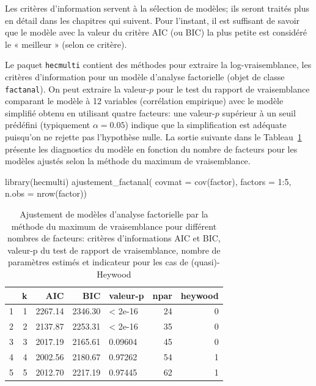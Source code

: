 \documentclass[
  11pt,
  letterpaper,
]{scrbook}
\newenvironment{Shaded}{\begin{snugshade}}{\end{snugshade}}
\newcommand{\AttributeTok}[1]{\textcolor[rgb]{0.40,0.45,0.13}{#1}}
\newcommand{\DecValTok}[1]{\textcolor[rgb]{0.68,0.00,0.00}{#1}}
\newcommand{\FunctionTok}[1]{\textcolor[rgb]{0.28,0.35,0.67}{#1}}
\newcommand{\NormalTok}[1]{\textcolor[rgb]{0.00,0.23,0.31}{#1}}
\newcommand{\SpecialCharTok}[1]{\textcolor[rgb]{0.37,0.37,0.37}{#1}}
\theoremstyle{definition}
\theoremstyle{remark}
\begin{document}
Les critères d'information servent à la sélection de modèles; ils seront
traités plus en détail dans les chapitres qui suivent. Pour l'instant,
il est suffisant de savoir que le modèle avec la valeur du critère AIC
(ou BIC) la plus petite est considéré le « meilleur » (selon ce
critère).

Le paquet \texttt{hecmulti} contient des méthodes pour extraire la
log-vraisemblance, les critères d'information pour un modèle d'analyse
factorielle (objet de classe \texttt{factanal}). On peut extraire la
valeur-\(p\) pour le test du rapport de vraisemblance comparant le
modèle à 12 variables (corrélation empirique) avec le modèle simplifié
obtenu en utilisant quatre facteurs: une valeur-\(p\) supérieur à un
seuil prédéfini (typiquement \(\alpha=0.05\)) indique que la
simplification est adéquate puisqu'on ne rejette pas l'hypothèse nulle.
La sortie suivante dans le Tableau~\ref{tbl-emvcrit} présente les
diagnostics du modèle en fonction du nombre de facteurs pour les modèles
ajustés selon la méthode du maximum de vraisemblance.

\begin{Shaded}
\begin{Highlighting}[]
\FunctionTok{library}\NormalTok{(hecmulti)}
\FunctionTok{ajustement\_factanal}\NormalTok{(}
    \AttributeTok{covmat =} \FunctionTok{cov}\NormalTok{(factor),}
    \AttributeTok{factors =} \DecValTok{1}\SpecialCharTok{:}\DecValTok{5}\NormalTok{,}
    \AttributeTok{n.obs =} \FunctionTok{nrow}\NormalTok{(factor))}
\end{Highlighting}
\end{Shaded}

\hypertarget{tbl-emvcrit}{}
\begin{table}
\caption{\label{tbl-emvcrit}Ajustement de modèles d'analyse factorielle par la méthode du maximum de
vraisemblance pour différent nombres de facteurs: critères
d'informations AIC et BIC, valeur-p du test de rapport de vraisemblance,
nombre de paramètres estimés et indicateur pour les cas de
(quasi)-Heywood }\tabularnewline

\centering
\begin{tabular}{lrrrlrr}
\toprule
  & k & AIC & BIC & valeur-p & npar & heywood\\
\midrule
1 & 1 & 2267.14 & 2346.30 & < 2e-16 & 24 & 0\\
2 & 2 & 2137.87 & 2253.31 & < 2e-16 & 35 & 0\\
3 & 3 & 2017.19 & 2165.61 & 0.09604 & 45 & 0\\
4 & 4 & 2002.56 & 2180.67 & 0.97262 & 54 & 1\\
5 & 5 & 2012.70 & 2217.19 & 0.97445 & 62 & 1\\
\bottomrule
\end{tabular}
\end{table}
\end{document}
